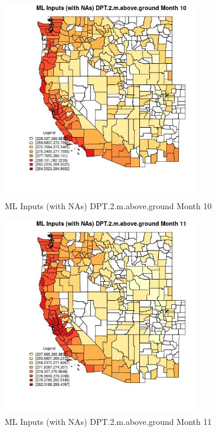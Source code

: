 \begin{figure} 
\centering  
\includegraphics[width=0.77\textwidth]{Code_Outputs/Report_ML_input_PM25_Step4_part_f_de_duplicated_aveswNAs_CountyDPT2mabovegroundmedianMonth10.jpg} 
\caption{\label{fig:Report_ML_input_PM25_Step4_part_f_de_duplicated_aveswNAsCountyDPT2mabovegroundmedianMonth10}ML Inputs (with NAs) DPT.2.m.above.ground Month 10} 
\end{figure} 
 

\clearpage 

\begin{figure} 
\centering  
\includegraphics[width=0.77\textwidth]{Code_Outputs/Report_ML_input_PM25_Step4_part_f_de_duplicated_aveswNAs_CountyDPT2mabovegroundmedianMonth11.jpg} 
\caption{\label{fig:Report_ML_input_PM25_Step4_part_f_de_duplicated_aveswNAsCountyDPT2mabovegroundmedianMonth11}ML Inputs (with NAs) DPT.2.m.above.ground Month 11} 
\end{figure} 
 

